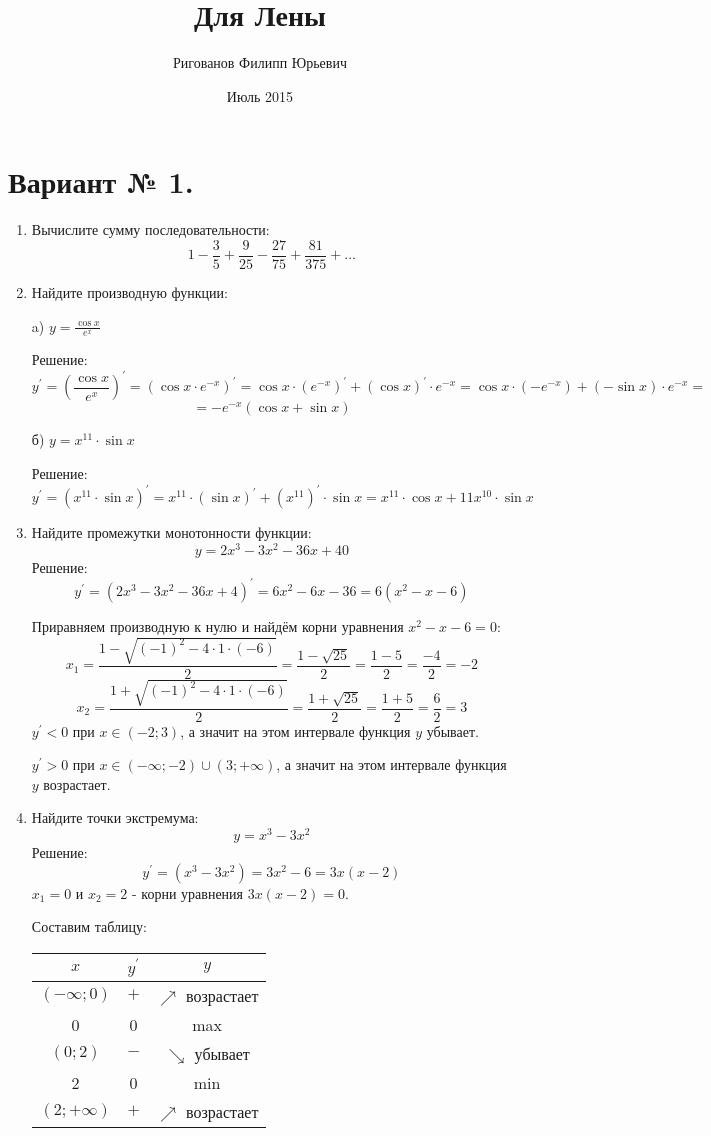 \documentclass{article}
\title{Для Лены}
\author{Ригованов Филипп Юрьевич}
\date{Июль 2015}
\begin{document}
\maketitle
\section*{Вариант № 1.}
\begin{enumerate}

\item %
Вычислите сумму последовательности:
$$1-\frac{3}{5}+\frac{9}{25}-\frac{27}{75}+\frac{81}{375}+\ldots$$
\item %
Найдите производную функции:

a) $y=\frac{\cos{x}}{e^x}$

Решение:
$$y^\prime=\left(\frac{\cos{x}}{e^x}\right)^\prime=\left(\cos{x}\cdot e^{-x}\right)^\prime=\cos{x}\cdot\left(e^{-x}\right)^\prime+\left(\cos{x}\right)^\prime\cdot e^{-x}=\cos{x}\cdot\left(-e^{-x}\right)+\left(-\sin{x}\right)\cdot e^{-x}=$$ $$=-e^{-x}\left(\cos{x}+\sin{x}\right)$$

б) $y=x^{11}\cdot\sin{x}$

Решение:
$$y^\prime=\left(x^{11}\cdot\sin{x}\right)^\prime=x^{11}\cdot\left(\sin{x}\right)^\prime+\left(x^{11}\right)^\prime\cdot\sin{x}=x^{11}\cdot\cos{x}+11x^{10}\cdot\sin{x}$$

\item %
Найдите промежутки монотонности функции:
$$y=2x^3-3x^2-36x+40$$
Решение:
$$y^\prime=\left(2x^3-3x^2-36x+4\right)^\prime=6x^2-6x-36=6\left(x^2-x-6\right)$$ %

Приравняем производную к нулю и найдём корни уравнения $x^2-x-6=0$:
$$x_1=\frac{1-\sqrt{(-1)^2-4\cdot1\cdot(-6)}}{2}=\frac{1-\sqrt{25}}{2}=\frac{1-5}{2}=\frac{-4}{2}=-2$$
$$x_2=\frac{1+\sqrt{(-1)^2-4\cdot1\cdot(-6)}}{2}=\frac{1+\sqrt{25}}{2}=\frac{1+5}{2}=\frac{6}{2}=3$$
$y^\prime<0$ при $x\in\left(-2;3\right)$, а значит на этом интервале функция $y$ убывает.

$y^\prime>0$ при $x\in\left(-\infty;-2\right)\cup\left(3;+\infty\right)$, а значит на этом интервале функция $y$ возрастает.

\item %
Найдите точки экстремума:
$$y=x^3-3x^2$$
Решение:
$$y^\prime=\left(x^3-3x^2\right)=3x^2-6=3x(x-2)$$
$x_1=0$ и $x_2=2$ - корни уравнения $3x(x-2)=0$.

Составим таблицу:

\begin{center}
\begin{tabular}{|c|c|c|}
\hline
$x$ & $y^\prime$ & $y$ \\
\hline\hline
$\left(-\infty;0\right)$ & $+$ & $\nearrow$ возрастает \\
\hline
0 & 0 & max\\
\hline
$\left(0;2\right)$ & $-$ & $\searrow$ убывает\\
\hline
2 & 0 & min \\
\hline
$\left(2;+\infty\right)$ & $+$ & $\nearrow$ возрастает \\
\hline
\end{tabular}
\end{center}


\end{enumerate}
\end{document}
